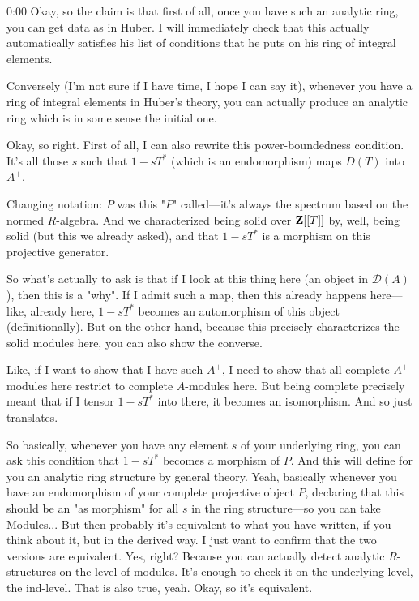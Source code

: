 \begin{unfinished}{0:00}
Okay, so the claim is that first of all, once you have such an analytic ring, you can get data as in Huber. I will immediately check that this actually automatically satisfies his list of conditions that he puts on his ring of integral elements.

Conversely (I'm not sure if I have time, I hope I can say it), whenever you have a ring of integral elements in Huber's theory, you can actually produce an analytic ring which is in some sense the initial one.

Okay, so right. First of all, I can also rewrite this power-boundedness condition. It's all those $s$ such that $1 - sT^*$ (which is an endomorphism) maps $D(T)$ into $A^+$.

Changing notation: $P$ was this "$P$" called---it's always the spectrum based on the normed $R$-algebra. And we characterized being solid over $\mathbf Z[[T]]$ by, well, being solid (but this we already asked), and that $1-sT^*$ is a morphism on this projective generator.

So what's actually to ask is that if I look at this thing here (an object in $\mathcal{D}(A)$), then this is a "why". If I admit such a map, then this already happens here---like, already here, $1-sT^*$ becomes an automorphism of this object (definitionally). But on the other hand, because this precisely characterizes the solid modules here, you can also show the converse.

Like, if I want to show that I have such $A^+$, I need to show that all complete $A^+$-modules here restrict to complete $A$-modules here. But being complete precisely meant that if I tensor $1-sT^*$ into there, it becomes an isomorphism. And so just translates.

So basically, whenever you have any element $s$ of your underlying ring, you can ask this condition that $1-sT^*$ becomes a morphism of $P$. And this will define for you an analytic ring structure by general theory. Yeah, basically whenever you have an endomorphism of your complete projective object $P$, declaring that this should be an "as morphism" for all $s$ in the ring structure---so you can take
Modules... But then probably it's equivalent to what you have written, if you think about it, but in the derived way. I just want to confirm that the two versions are equivalent. Yes, right? Because you can actually detect analytic $R$-structures on the level of modules. It's enough to check it on the underlying level, the ind-level. That is also true, yeah. Okay, so it's equivalent.


\end{unfinished}
